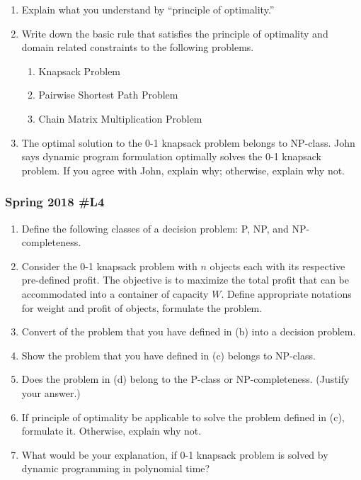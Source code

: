 \begin{enumerate}
		\item Explain what you understand by ``principle of optimality.''
		\item Write down the basic rule that satisfies the principle of optimality and domain related constraints to the following problems.
		\begin{enumerate}
			\item Knapsack Problem
			\item Pairwise Shortest Path Problem
			\item Chain Matrix Multiplication Problem
		\end{enumerate}
		\item The optimal solution to the 0-1 knapsack problem belongs to NP-class.  John says dynamic program formulation optimally solves the 0-1 knapsack problem.  If you agree with John, explain why; otherwise, explain why not.
	\end{enumerate}


\subsubsection{Spring 2018 \#L4}

\begin{enumerate}[label=\alph*.]
		\item Define the following classes of a decision problem:  P, NP, and NP-completeness.
		\item Consider the 0-1 knapsack problem with $n$ objects each with its respective pre-defined profit.  The objective is to maximize the total profit that can be accommodated into a container of capacity $W$.  Define appropriate notations for weight and profit of objects, formulate the problem.
		\item Convert of the problem that you have defined in (b) into a decision problem.
		\item Show the problem that you have defined in (c) belongs to NP-class.
		\item Does the problem in (d) belong to the P-class or NP-completeness. (Justify your answer.)
		\item If principle of optimality be applicable to solve the problem defined in (c), formulate it.  Otherwise, explain why not.  
		\item What would be your explanation, if 0-1 knapsack problem is solved by dynamic programming in polynomial time?
	\end{enumerate}

